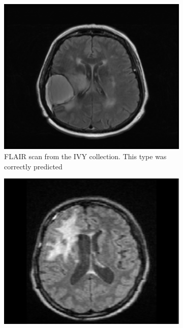 \begin{figure}[htbp]
\centering
    \begin{subfigure}[t]{0.25\textwidth}
        \centering
        \includegraphics[width=\textwidth]{Figures/FLAIR_Ivy.png}
        \caption{\gls{FLAIR} \gls{scan} from the \gls{IVY} collection. This \gls{type} was correctly predicted}\label{fig:IvyGAP_FLAIR}
    \end{subfigure}
    \hfill
    \begin{subfigure}[t]{0.25\textwidth}
        \centering
        \includegraphics[width=\textwidth]{Figures/FLAIR_RIDER.png}

\end{subfigure}
\end{figure}
